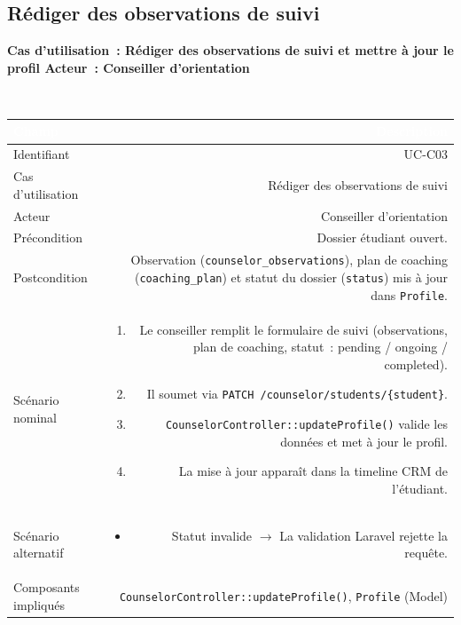 \documentclass[a4paper,12pt]{article}
\newcommand{\ucheader}[2]{%
  \noindent\colorbox{capblue}{\parbox{\dimexpr\linewidth-2\fboxsep}{%
    \color{white}\bfseries\large Cas d'utilisation~: #1 \hfill \normalsize Acteur~: #2
  }}\\[2pt]
}
\begin{document}
\vspace{1em}

\subsection{Rédiger des observations de suivi}
\ucheader{Rédiger des observations de suivi et mettre à jour le profil}{Conseiller d'orientation}

\noindent
\begin{tabular}{|L|R|}
\hline
{}\textcolor{white}{\textbf{Champ}} & \textcolor{white}{\textbf{Description}} \\
\hline
{}Identifiant & UC-C03 \\
\hline
Cas d'utilisation & Rédiger des observations de suivi \\
\hline
{}Acteur & Conseiller d'orientation \\
\hline
Précondition & Dossier étudiant ouvert. \\
\hline
{}Postcondition & Observation (\texttt{counselor\_observations}), plan de coaching (\texttt{coaching\_plan}) et statut du dossier (\texttt{status}) mis à jour dans \texttt{Profile}. \\
\hline
Scénario nominal &
\begin{enumerate}
  \item Le conseiller remplit le formulaire de suivi (observations, plan de coaching, statut~: pending / ongoing / completed).
  \item Il soumet via \texttt{PATCH /counselor/students/\{student\}}.
  \item \texttt{CounselorController::updateProfile()} valide les données et met à jour le profil.
  \item La mise à jour apparaît dans la timeline CRM de l'étudiant.
\end{enumerate} \\
\hline
{}Scénario alternatif &
\begin{itemize}
  \item Statut invalide $\rightarrow$ La validation Laravel rejette la requête.
\end{itemize} \\
\hline
Composants impliqués & \texttt{CounselorController::updateProfile()}, \texttt{Profile} (Model) \\
\hline
\end{tabular}
\end{document}
